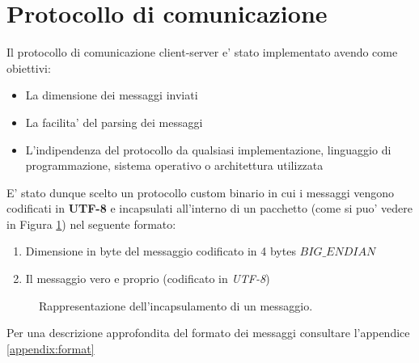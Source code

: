 \section{Protocollo di comunicazione}
Il protocollo di comunicazione client-server e' stato implementato avendo come obiettivi:
\begin{itemize}
	\item La dimensione dei messaggi inviati
	\item La facilita' del parsing dei messaggi
	\item L'indipendenza del protocollo da qualsiasi implementazione, linguaggio di programmazione, sistema operativo o architettura utilizzata
\end{itemize}

\begin{lrbox}{\asciiart}
	\begin{varwidth}{\maxdimen}
		\noindent
	\end{varwidth}
\end{lrbox}%

E' stato dunque scelto un protocollo custom binario in cui i messaggi vengono codificati in \textbf{UTF-8} e incapsulati all'interno di un pacchetto (come si puo' vedere in Figura \ref{fig:proto_fmt1}) nel seguente formato:
\begin{enumerate}
	\item Dimensione in byte del messaggio codificato in 4 bytes $BIG\_ENDIAN$
	\item Il messaggio vero e proprio (codificato in \emph{UTF-8})
\end{enumerate}

\begin{center}
	\begin{figure}[t!]
		\makebox[\textwidth]{\showasciiart{80.5ex}}
		\caption{Rappresentazione dell'incapsulamento di un messaggio.}
		\label{fig:proto_fmt1}
	\end{figure}
\end{center}

Per una descrizione approfondita del formato dei messaggi consultare l'appendice \ref{appendix:format}